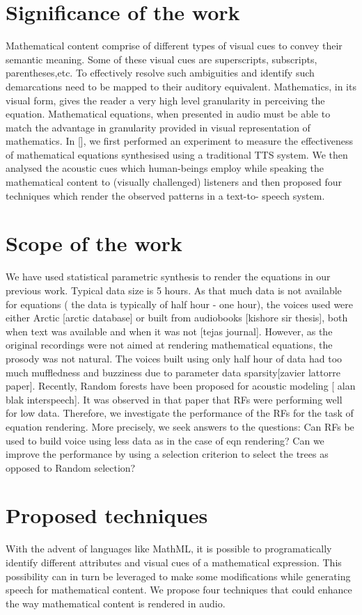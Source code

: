 \documentclass{article}
\begin{document}
\section{Significance of the work}
Mathematical content comprise of different types of visual cues to convey their semantic meaning. Some of these visual cues are superscripts, subscripts, parentheses,etc.  To effectively resolve such ambiguities and identify such demarcations need to be mapped to their auditory equivalent. Mathematics, in its visual form, gives the reader a very high level granularity in perceiving the equation. Mathematical equations, when presented in audio must be able to match the advantage in granularity provided in visual representation of mathematics.  In [], we first performed an experiment to measure the effectiveness of mathematical equations synthesised  using a traditional TTS system. We then analysed the acoustic cues which human-beings employ while speaking the mathematical content to (visually challenged) listeners and then proposed four techniques which render the observed patterns in a text-to- speech system.  

\section{Scope of the work}
We have used statistical parametric synthesis to render the equations in our previous work. Typical data size is 5 hours. As that much data is not available for equations ( the data is typically of half hour - one hour), the voices used were either Arctic [arctic database] or built from audiobooks [kishore sir thesis], both when text was available and when it was not [tejas journal].  However, as the original recordings were not aimed at rendering mathematical equations, the prosody was not natural. The voices built using only half hour of data had too much muffledness and buzziness due to parameter data sparsity[zavier lattorre paper]. Recently, Random forests have been proposed for acoustic modeling [ alan blak interspeech]. It was observed in that paper that RFs were performing well for low data. Therefore, we investigate the performance of the RFs for the task of equation rendering. More precisely, we seek answers to the questions: Can RFs be used to build voice using less data as in the case of eqn rendering? Can we improve the performance by using a selection criterion to select the trees as opposed to Random selection? 

\section{Proposed techniques}
\label{sec:techniques}
With the advent of languages like MathML, it is possible to programatically identify different attributes and visual cues of a mathematical expression. This possibility can in turn be leveraged to make some modifications  while generating speech for mathematical content.  We propose four techniques that could enhance the way mathematical content is rendered in audio.
\end{document}
